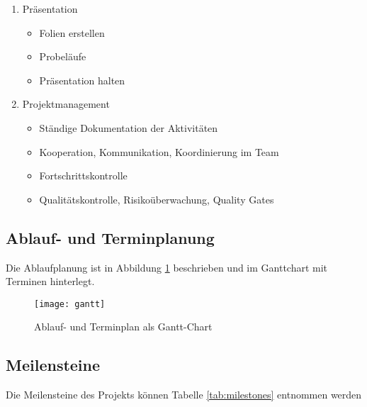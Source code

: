 \documentclass[12pt,titlepage]{article}
\begin{document}
\begin{enumerate}
\item Präsentation
\begin{itemize}
\item Folien erstellen
\item Probeläufe
\item Präsentation halten

\end{itemize}

\item Projektmanagement
\begin{itemize}
\item Ständige Dokumentation der Aktivitäten
\item Kooperation, Kommunikation, Koordinierung im Team
\item Fortschrittskontrolle
\item Qualitätskontrolle, Risikoüberwachung, Quality Gates
\end{itemize}

\end{enumerate}
 
\subsection{Ablauf- und Terminplanung}
Die Ablaufplanung ist in Abbildung \ref{fig:gantt} beschrieben und im Ganttchart mit Terminen hinterlegt.
\begin{figure}[!h]
    \centering
    \texttt{[image: gantt]}
    \caption{Ablauf- und Terminplan als Gantt-Chart}
    \label{fig:gantt}
\end{figure}

 \subsection{Meilensteine}
Die Meilensteine des Projekts können Tabelle \ref{tab:milestones} entnommen werden
 
\end{document}
